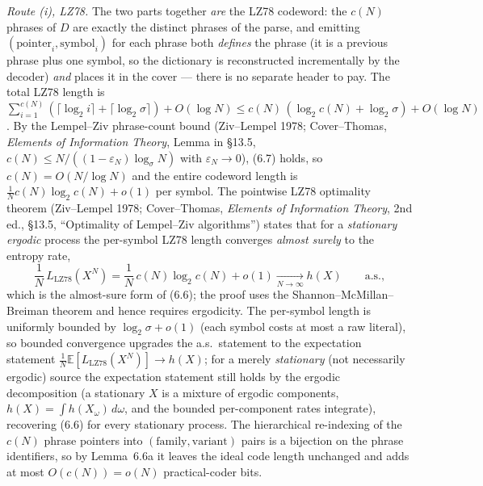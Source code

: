 \documentclass[
]{article}
\begin{document}
\emph{Route (i), LZ78.} The two parts together \emph{are} the LZ78
codeword: the $c(N)$ phrases of $D$ are exactly the distinct phrases of
the parse, and emitting $(\mathrm{pointer}_i, \mathrm{symbol}_i)$ for
each phrase both \emph{defines} the phrase (it is a previous phrase
plus one symbol, so the dictionary is reconstructed incrementally by
the decoder) \emph{and} places it in the cover --- there is no separate
header to pay. The total LZ78 length is
$\sum_{i=1}^{c(N)} \left(\lceil\log_2 i\rceil + \lceil\log_2
\sigma\rceil\right) + O(\log N) \le c(N)\,(\log_2 c(N) + \log_2 \sigma)
+ O(\log N)$. By the Lempel--Ziv phrase-count bound (Ziv--Lempel 1978;
Cover--Thomas, \emph{Elements of Information Theory}, Lemma in \S13.5,
$c(N) \le N/((1-\varepsilon_N)\log_\sigma N)$ with $\varepsilon_N \to
0$), (6.7) holds, so $c(N) = O(N/\log N)$ and the entire codeword
length is $\tfrac{1}{N} c(N) \log_2 c(N) + o(1)$ per symbol. The
pointwise LZ78 optimality theorem (Ziv--Lempel 1978; Cover--Thomas,
\emph{Elements of Information Theory}, 2nd ed., \S13.5, ``Optimality of
Lempel--Ziv algorithms'') states that for a \emph{stationary ergodic}
process the per-symbol LZ78 length converges \emph{almost surely} to
the entropy rate,
\[
\frac{1}{N}\,L_{\mathrm{LZ78}}(X^N) = \frac{1}{N}\,c(N)\log_2 c(N) + o(1)
\xrightarrow[N\to\infty]{} h(X) \qquad \text{a.s.},
\]
which is the almost-sure form of (6.6); the proof uses the
Shannon--McMillan--Breiman theorem and hence requires ergodicity. The
per-symbol length is uniformly bounded by $\log_2\sigma + o(1)$ (each
symbol costs at most a raw literal), so bounded convergence upgrades
the a.s.\ statement to the expectation statement
$\tfrac{1}{N}\mathbb{E}[L_{\mathrm{LZ78}}(X^N)] \to h(X)$; for a merely
\emph{stationary} (not necessarily ergodic) source the expectation
statement still holds by the ergodic decomposition (a stationary $X$ is
a mixture of ergodic components, $h(X) = \int h(X_\omega)\,d\omega$,
and the bounded per-component rates integrate), recovering (6.6) for
every stationary process. The
hierarchical re-indexing of the $c(N)$ phrase pointers into
$(\mathrm{family},\mathrm{variant})$ pairs is a bijection on the phrase
identifiers, so by Lemma~6.6a it leaves the ideal code length
unchanged and adds at most $O(c(N)) = o(N)$ practical-coder bits.
\end{document}
